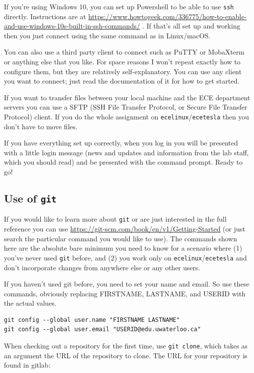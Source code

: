 \documentclass[letterpaper,10pt]{article}
\begin{document}
If you're using Windows 10, you can set up Powershell to be able to use \texttt{ssh} directly. Instructions are at \url{https://www.howtogeek.com/336775/how-to-enable-and-use-windows-10s-built-in-ssh-commands/} . If that's all set up and working then you just connect using the same command as in Linux/macOS.

You can also use a third party client to connect such as PuTTY or MobaXterm or anything else that you like. For space reasons I won't repeat exactly how to configure them, but they are relatively self-explanatory. You can use any client you want to connect; just read the documentation of it for how to get started.

If you want to transfer files between your local machine and the ECE department servers you can use a SFTP (SSH File Transfer Protocol, or Secure File Transfer Protocol) client. If you do the whole assignment on \texttt{ecelinux}/\texttt{ecetesla} then you don't have to move files.

If you have everything set up correctly, when you log in you will be presented with a little login message (news and updates and information from the lab staff, which you should read) and be presented with the command prompt. Ready to go!

\subsection*{Use of \texttt{git}}
If you would like to learn more about \texttt{git} or are just interested in the full reference you can use \url{https://git-scm.com/book/en/v1/Getting-Started} (or just search the particular command you would like to use). The commands shown here are the absolute bare minimum you need to know for a scenario where (1) you've never used \texttt{git} before, and (2) you work only on \texttt{ecelinux}/\texttt{ecetesla} and don't incorporate changes from anywhere else or any other users.

If you haven't used git before, you need to set your name and email. So use these commands, obviously replacing FIRSTNAME, LASTNAME, and USERID with the actual values. 
\begin{lstlisting}
git config --global user.name "FIRSTNAME LASTNAME"
git config --global user.email "USERID@edu.uwaterloo.ca"
\end{lstlisting}

When checking out a repository for the first time, use \texttt{git clone}, which takes as an argument the URL of the repository to clone. The URL for your repository is found in gitlab:
\end{document}
